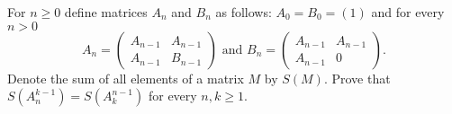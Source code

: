 \documentclass{article}
\begin{document}
\setlength{\parindent}{0pt}
For $n\ge0$ define matrices $A_{n}$ and $B_{n}$ as follows: $A_{0}=B_{0}=(1)$ and for every $n>0$$$A_{n}=\begin{pmatrix}A_{n-1}&A_{n-1}\\A_{n-1}&B_{n-1}\end{pmatrix}\text{ and }B_{n}=\begin{pmatrix}A_{n-1}&A_{n-1}\\A_{n-1}&0\end{pmatrix}.$$Denote the sum of all elements of a matrix $M$ by $S(M)$. Prove that $S(A_{n}^{k-1})=S(A^{n-1}_{k})$ for every $n,k\ge1$.
\end{document}
